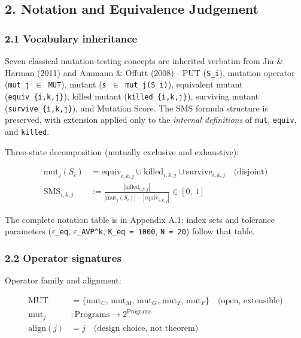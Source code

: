 \documentclass[review,12pt,authoryear]{elsarticle}
\begin{document}
\subsection{2. Notation and Equivalence Judgement}\label{notation-and-equivalence-judgement}

\subsubsection{2.1 Vocabulary inheritance}\label{vocabulary-inheritance}

Seven classical mutation-testing concepts are inherited verbatim from
Jia \& Harman (2011) and Ammann \& Offutt (2008) - PUT (\texttt{S\_i}),
mutation operator (\texttt{mut\_j\ $\in$\ MUT}), mutant
(\texttt{s\textquotesingle{}\ $\in$\ mut\_j(S\_i)}), equivalent mutant
(\texttt{equiv\_\{i,k,j\}}), killed mutant (\texttt{killed\_\{i,k,j\}}),
surviving mutant (\texttt{survive\_\{i,k,j\}}), and Mutation Score. The
SMS formula structure is preserved, with extension applied only to the
\emph{internal definitions} of \texttt{mut}, \texttt{equiv}, and
\texttt{killed}.

Three-state decomposition (mutually exclusive and exhaustive):

\begin{align*}
\mathrm{mut}_j(S_i) &= \mathrm{equiv}_{i,k,j} \cup \mathrm{killed}_{i,k,j} \cup \mathrm{survive}_{i,k,j} \quad \text{(disjoint)} \\
\mathrm{SMS}_{i,k,j} &:= \frac{|\mathrm{killed}_{i,k,j}|}{|\mathrm{mut}_j(S_i)| - |\mathrm{equiv}_{i,k,j}|} \in [0,\,1]
\end{align*}

The complete notation table is in Appendix A.1; index sets and tolerance
parameters (\texttt{$\varepsilon$\_eq}, \texttt{$\varepsilon$\_AVP\^{}k},
\texttt{K\_eq\ =\ 1000}, \texttt{N\ =\ 20}) follow that table.

\subsubsection{2.2 Operator signatures}\label{operator-signatures}

Operator family and alignment:

\begin{align*}
\mathrm{MUT} &= \{\mathrm{mut}_C,\, \mathrm{mut}_M,\, \mathrm{mut}_G,\, \mathrm{mut}_T,\, \mathrm{mut}_F\} \quad \text{(open, extensible)} \\
\mathrm{mut}_j &: \text{Programs} \to 2^{\text{Programs}} \\
\mathrm{align}(j) &= j \quad \text{(design choice, not theorem)}
\end{align*}
\end{document}
